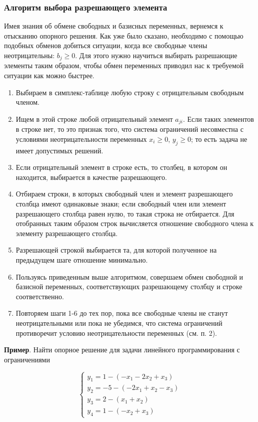 \documentclass[a4paper,12pt]{report}
\begin{document}
\subsubsection{Алгоритм выбора разрешающего элемента}
Имея знания об обмене свободных и базисных переменных, вернемся к отысканию опорного решения. Как уже было сказано, необходимо с помощью подобных обменов добиться ситуации, когда все свободные члены неотрицательны: $b_{j} \geq 0$. Для этого нужно научиться выбирать разрешающие элементы таким образом, чтобы обмен переменных приводил нас к требуемой ситуации как можно быстрее.
\begin{enumerate}
\item Выбираем в симплекс-таблице любую строку с отрицательным свободным членом.
\item Ищем в этой строке любой отрицательный элемент $a_{ji}$. Если таких элементов в строке нет, то это признак того, что система ограничений несовместна с условиями неотрицательности переменных $x_{i} \geq 0$, $y_{j} \geq 0$; то есть задача не имеет допустимых решений.
\item Если отрицательный элемент в строке есть, то столбец, в котором он находится, выбирается в качестве разрешающего.
\item Отбираем строки, в которых свободный член и элемент разрешающего столбца имеют одинаковые знаки; если свободный член или элемент разрешающего столбца равен нулю, то такая строка не отбирается. Для отобранных таким образом строк вычисляется отношение свободного члена к элементу разрешающего столбца.
\item Разрешающей строкой выбирается та, для которой полученное на предыдущем шаге отношение минимально.
\item Пользуясь приведенным выше алгоритмом, совершаем обмен свободной и базисной переменных, соответствующих разрешающему столбцу и строке соответственно.
\item Повторяем шаги 1-6 до тех пор, пока все свободные члены не станут неотрицательными или пока не убедимся, что система ограничений противоречит условию неотрицательности переменных (см. п. 2).
\end{enumerate}

\textbf{Пример}. Найти опорное решение для задачи линейного программирования с ограничениями

\begin{equation*}
\begin{cases}
y_{1} = 1 - (-x_{1} - 2x_{2} + x_{3})\\
y_{2} = -5 - (-2x_{1} + x_{2} - x_{3})\\
y_{3} = 2 - (x_{1} + x_{2})\\
y_{4} = 1 - (-x_{2} + x_{3})
\end{cases}	
\end{equation*}
\end{document}
